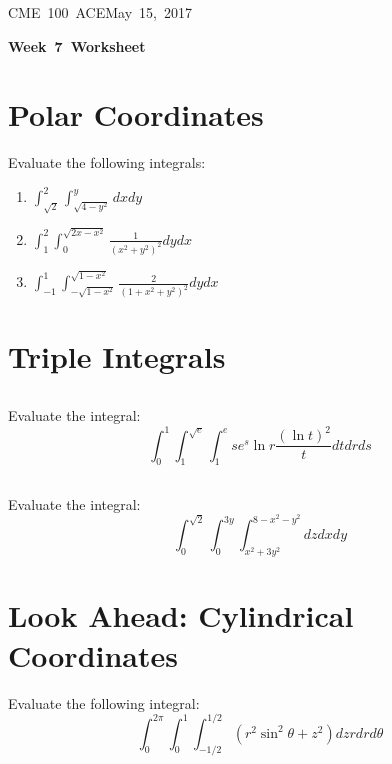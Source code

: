 \documentclass[letterpaper, 11pt]{article}
\makeatletter
\newcommand{\hmwkTitle}{Week\ 7\ Worksheet} %
\newcommand{\hmwkClass}{CME\ 100\ ACE} %
\newcommand{\hmwkAuthorName}{Timothy Anderson} %
\newcommand{\hmwkAuthorEmail}{timmya@stanford.edu} %
\makeatother
\begin{document}
\noindent
\normalsize 
\hmwkClass \hfill May\ 15,\ 2017\\

\begin{center} \Large \textbf{\hmwkTitle} \end{center}

\section{Polar Coordinates}
Evaluate the following integrals:
\begin{enumerate}[label=(\alph*)]
\item $\int_{\sqrt{2}}^2 \int_{\sqrt{ 4- y^2}}^y dx dy$

\item $ \int_1^2 \int_0^{\sqrt{2x - x^2}} \frac{1}{(x^2 + y^2)^2} dy dx$

\item $ \int_{-1}^1 \int_{-\sqrt{1 - x^2}}^{\sqrt{1 - x^2}} \frac{2}{(1 + x^2 + y^2)^2}dy dx$

\end{enumerate}

\section{Triple Integrals}
\subsection{} Evaluate the integral:
\[ \int_0^1 \int_1^{\sqrt{e}} \int_1^e se^s \ln r \frac{(\ln t)^2}{t} dt dr ds \]

\subsection{} Evaluate the integral:
\[ \int_0^{\sqrt{2}} \int_0^{3y} \int_{x^2 + 3y^2}^{8-x^2 - y^2} dz dx dy \]


\section{Look Ahead: Cylindrical Coordinates}
Evaluate the following integral:
\[ \int_0^{2 \pi} \int_0^1 \int_{-1/2}^{1/2} (r^2 \sin^2 \theta + z^2) dz r dr d\theta \]
\end{document}
